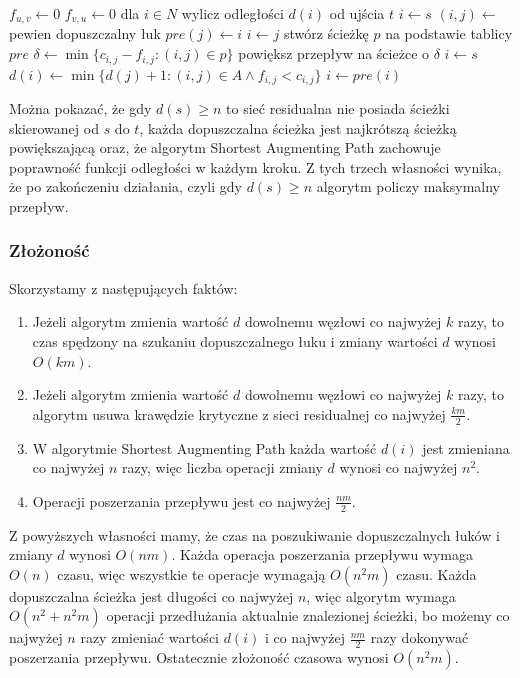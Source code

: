 \documentclass{article}
\begin{document}
\begin{algorithmic}
		\State $f_{u,v}\gets 0$
		\State $f_{v,u}\gets 0$
	\EndFor
	\State dla $i\in N$ wylicz odległości $d(i)$ od ujścia $t$
	\State$i\gets s$
		\State $(i,j)\gets$ pewien dopuszczalny łuk
		\State $pre(j)\gets i$
		\State $i\gets j$
		\State stwórz ścieżkę $p$ na podstawie tablicy $pre$
		\State $\delta\gets \min\{c_{i,j}-f_{i,j}:(i,j)\in p\}$
		\State powiększ przepływ na ścieżce o $\delta$
		\State $i\gets s$
		\EndIf
		\Else
			\State $d(i)\gets \min\{d(j)+1:(i,j)\in A \wedge f_{i,j}<c_{i,j}\}$
				\State $i\gets pre(i)$
			\EndIf
		\EndIf 
	\EndWhile
\EndFunction
\end{algorithmic}
Można pokazać, że gdy $d(s)\geq n$ to sieć residualna nie posiada ścieżki skierowanej od $s$ do $t$, każda dopuszczalna ścieżka jest najkrótszą ścieżką powiększającą oraz, że algorytm Shortest Augmenting Path zachowuje poprawność funkcji odległości w każdym kroku. Z tych trzech własności wynika, że po zakończeniu działania, czyli gdy $d(s)\geq n$ algorytm policzy maksymalny przepływ.

\subsubsection{Złożoność}
Skorzystamy z następujących faktów:
\begin{enumerate} [1)]
\item Jeżeli algorytm zmienia wartość $d$ dowolnemu węzłowi co najwyżej $k$ razy, to czas spędzony na szukaniu dopuszczalnego łuku i zmiany wartości $d$ wynosi $O(km)$.
\item Jeżeli algorytm zmienia wartość $d$ dowolnemu węzłowi co najwyżej $k$ razy, to algorytm usuwa krawędzie krytyczne z sieci residualnej co najwyżej $\frac{km}{2}$. 
\item W algorytmie Shortest Augmenting Path każda wartość $d(i)$ jest zmieniana co najwyżej $n$ razy, więc liczba operacji zmiany $d$ wynosi co najwyżej $n^2$.
\item Operacji poszerzania przepływu jest co najwyżej $\frac{nm}{2}$.
\end{enumerate}
Z powyższych własności mamy, że czas na poszukiwanie dopuszczalnych łuków i zmiany $d$ wynosi $O(nm)$. Każda operacja poszerzania przepływu wymaga $O(n)$ czasu, więc wszystkie te operacje wymagają $O(n^2m)$ czasu. Każda dopuszczalna ścieżka jest długości co najwyżej $n$, więc algorytm wymaga $O(n^2+n^2m)$ operacji przedłużania aktualnie znalezionej ścieżki, bo możemy co najwyżej $n$ razy zmieniać wartości $d(i)$ i co najwyżej $\frac{nm}{2}$ razy dokonywać poszerzania przepływu. Ostatecznie złożoność czasowa wynosi $O(n^2m)$.
\end{document}

